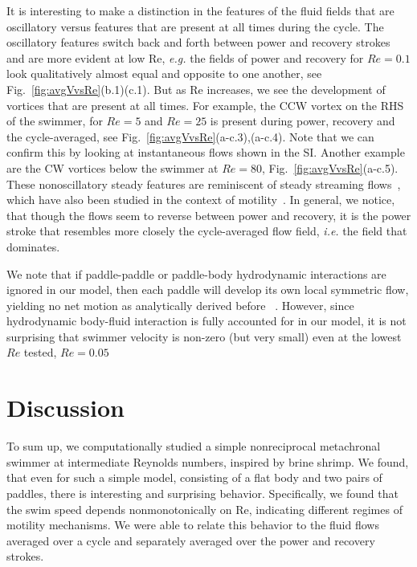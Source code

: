 \documentclass[%
 onecolumn,
superscriptaddress,
 amsmath,amssymb,
 aps,
longbibliography
]{revtex4-2}
\begin{document}
It is interesting to make a distinction in the features of the fluid fields that are oscillatory versus features that are present at all times during the cycle. The oscillatory features switch back and forth between power and recovery strokes and are more evident at low Re, \textit{e.g.} the fields of power and recovery for $Re=0.1$ look qualitatively almost equal and opposite to one another, see Fig.~\ref{fig:avgVvsRe}(b.1)(c.1). But as Re increases, we see the development of vortices that are present at all times. For example, the CCW vortex on the RHS of the swimmer, for $Re=5$ and $Re=25$ is present during power, recovery and the cycle-averaged, see Fig.~\ref{fig:avgVvsRe}(a-c.3),(a-c.4). Note that we can confirm this by looking at  instantaneous flows shown in the SI. Another example are the CW vortices below the swimmer at $Re=80$, Fig.~\ref{fig:avgVvsRe}(a-c.5). These nonoscillatory steady features are reminiscent of steady streaming flows~\cite{riley66,riley2001}, which have also been studied in the context of motility~\cite{Dombrowski2020Kinematics}.  
In general, we notice, that though the flows seem to reverse between power and recovery, it is the power stroke that resembles more closely the cycle-averaged flow field, \textit{i.e.} the field that dominates. 

We note that if paddle-paddle or paddle-body hydrodynamic interactions are ignored in our model, then each paddle will develop its own local symmetric flow, yielding no net motion as analytically derived before ~\cite{Takagi2015Swimming}. 
However, since hydrodynamic body-fluid interaction is fully accounted for in our model, it is not surprising that swimmer velocity is non-zero (but very small) even at the lowest $Re$ tested, $Re = 0.05$


\section{Discussion}

To sum up, we computationally studied a simple nonreciprocal metachronal swimmer at intermediate Reynolds numbers, inspired by brine shrimp. We found, that even for such a simple model, consisting of a flat body and two pairs of paddles, there is interesting and surprising behavior. Specifically, we found that the swim speed depends nonmonotonically on Re, indicating different regimes of motility mechanisms. We were able to relate this behavior to the fluid flows averaged over a cycle and separately averaged over the power and recovery strokes. 
\end{document}
